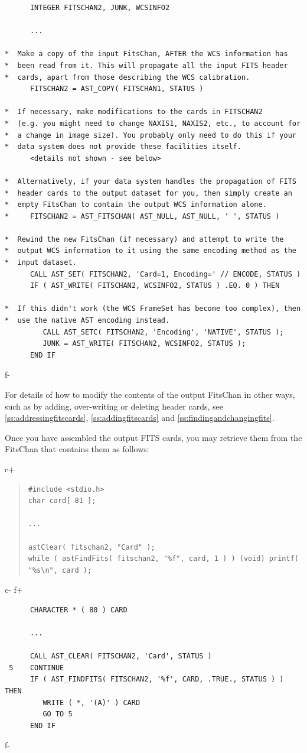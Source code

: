 \documentclass[twoside,11pt]{article}
\newcommand{\secref}[1]{\S\ref{#1}}
\renewcommand{\secref}[1]{\ref{#1}}
\begin{document}
\begin{verbatim}
      INTEGER FITSCHAN2, JUNK, WCSINFO2

      ...

*  Make a copy of the input FitsChan, AFTER the WCS information has
*  been read from it. This will propagate all the input FITS header
*  cards, apart from those describing the WCS calibration.
      FITSCHAN2 = AST_COPY( FITSCHAN1, STATUS )

*  If necessary, make modifications to the cards in FITSCHAN2
*  (e.g. you might need to change NAXIS1, NAXIS2, etc., to account for
*  a change in image size). You probably only need to do this if your
*  data system does not provide these facilities itself.
      <details not shown - see below>

*  Alternatively, if your data system handles the propagation of FITS
*  header cards to the output dataset for you, then simply create an
*  empty FitsChan to contain the output WCS information alone.
*     FITSCHAN2 = AST_FITSCHAN( AST_NULL, AST_NULL, ' ', STATUS )

*  Rewind the new FitsChan (if necessary) and attempt to write the
*  output WCS information to it using the same encoding method as the
*  input dataset.
      CALL AST_SET( FITSCHAN2, 'Card=1, Encoding=' // ENCODE, STATUS )
      IF ( AST_WRITE( FITSCHAN2, WCSINFO2, STATUS ) .EQ. 0 ) THEN

*  If this didn't work (the WCS FrameSet has become too complex), then
*  use the native AST encoding instead.
         CALL AST_SETC( FITSCHAN2, 'Encoding', 'NATIVE', STATUS );
         JUNK = AST_WRITE( FITSCHAN2, WCSINFO2, STATUS );
      END IF
\end{verbatim}
\normalsize
f-

For details of how to modify the contents of the output FitsChan in
other ways, such as by adding, over-writing or deleting header cards,
see \secref{ss:addressingfitscards}, \secref{ss:addingfitscards} and
\secref{ss:findingandchangingfits}.

Once you have assembled the output FITS cards, you may retrieve them
from the FitsChan that contains them as follows:

c+
\begin{quote}
\small
\begin{verbatim}
#include <stdio.h>
char card[ 81 ];

...

astClear( fitschan2, "Card" );
while ( astFindFits( fitschan2, "%f", card, 1 ) ) (void) printf( "%s\n", card );
\end{verbatim}
\normalsize
\end{quote}
c-
f+
\small
\begin{verbatim}
      CHARACTER * ( 80 ) CARD

      ...

      CALL AST_CLEAR( FITSCHAN2, 'Card', STATUS )
 5    CONTINUE
      IF ( AST_FINDFITS( FITSCHAN2, '%f', CARD, .TRUE., STATUS ) ) THEN
         WRITE ( *, '(A)' ) CARD
         GO TO 5
      END IF
\end{verbatim}
\normalsize
f-
\end{document}
